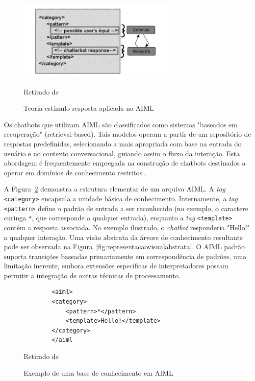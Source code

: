 \documentclass[14pt,a4paper,oneside]{book}
\begin{document}
\begin{figure}
    \centering
    \caption{Teoria estímulo-resposta aplicada no AIML}
    \includegraphics[width=0.7\textwidth]{fig/image10.png} %
    \label{fig:teoriaestimulo}
    \vspace{0.2cm}
    {\footnotesize 
	
	Retirado de \cite{Lima2017}}
\end{figure}

Os chatbots que utilizam AIML são classificados como sistemas "baseados em recuperação" (retrieval-based). Tais modelos operam a partir de um repositório de respostas predefinidas, selecionando a mais apropriada com base na entrada do usuário e no contexto conversacional, guiando assim o fluxo da interação. Esta abordagem é frequentemente empregada na construção de chatbots destinados a operar em domínios de conhecimento restritos \cite{Borah2019}.

A Figura~\ref{fig:exemplodeumabase} demonstra a estrutura elementar de um arquivo AIML. A \emph{tag} \texttt{<category>} encapsula a unidade básica de conhecimento. Internamente, a \emph{tag} \texttt{<pattern>} define o padrão de entrada a ser reconhecido (no exemplo, o caractere curinga \texttt{*}, que corresponde a qualquer entrada), enquanto a \emph{tag} \texttt{<template>} contém a resposta associada. No exemplo ilustrado, o \emph{chatbot} responderia "Hello!" a qualquer interação. Uma visão abstrata da árvore de conhecimento resultante pode ser observada na Figura~\ref{fig:representacaovisualabstrata}. O AIML padrão suporta transições baseadas primariamente em correspondência de padrões, uma limitação inerente, embora extensões específicas de interpretadores possam permitir a integração de outras técnicas de processamento.

\begin{figure}
	\centering
	\caption{Exemplo de uma base de conhecimento em AIML}
	\begin{verbatim}
		<aiml>
		<category>
			<pattern>*</pattern>
			<template>Hello!</template>
		</category>
		</aiml
	\end{verbatim}	
	\label{fig:exemplodeumabase}
	\vspace{0.2cm} %
    {\footnotesize 
	
	Retirado de \cite{Wallace2000}}
\end{figure}
\end{document}
